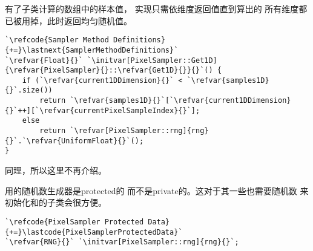 有了子类计算的数组中的样本值，
实现只需依维度返回值直到算出的
所有维度都已被用掉，此时返回均匀随机值。
\begin{lstlisting}
`\refcode{Sampler Method Definitions}{+=}\lastnext{SamplerMethodDefinitions}`
`\refvar{Float}{}` `\initvar[PixelSampler::Get1D]{\refvar{PixelSampler}{}::\refvar{Get1D}{}}{}`() {
    if (`\refvar{current1DDimension}{}` < `\refvar{samples1D}{}`.size())
        return `\refvar{samples1D}{}`[`\refvar{current1DDimension}{}`++][`\refvar{currentPixelSampleIndex}{}`];
    else
        return `\refvar[PixelSampler::rng]{rng}{}`.`\refvar{UniformFloat}{}`();
}
\end{lstlisting}

同理，所以这里不再介绍。

用的随机数生成器是{\ttfamily protected}的
而不是{\ttfamily private}的。这对于其一些也需要随机数
来初始化和的子类会很方便。
\begin{lstlisting}
`\refcode{PixelSampler Protected Data}{+=}\lastcode{PixelSamplerProtectedData}`
`\refvar{RNG}{}` `\initvar[PixelSampler::rng]{rng}{}`;
\end{lstlisting}

